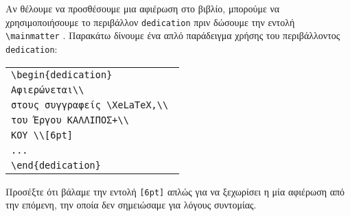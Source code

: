 \begin{refsection}
Αν θέλουμε να προσθέσουμε μια αφιέρωση στο βιβλίο, μπορούμε να χρησιμοποιήσουμε το περιβάλλον \texttt{dedication} πριν δώσουμε την εντολή \verb|\mainmatter| . Παρακάτω δίνουμε ένα απλό παράδειγμα χρήσης του περιβάλλοντος \texttt{dedication}:
\begin{center}
\begin{tabular}{l}
\verb=\begin{dedication}=\\
\verb=Αφιερώνεται\\ =\\
\verb=στους συγγραφείς \XeLaTeX,\\ =\\
\verb=του Έργου ΚΑΛΛΙΠΟΣ+\\ =\\
\verb=ΚΟΥ \\[6pt]=\\
\verb=... =\\
\verb=\end{dedication} =\\
\end{tabular}
\end{center}
Προσέξτε ότι βάλαμε την εντολή \verb|[6pt]| απλώς για να ξεχωρίσει η μία αφιέρωση από την επόμενη, την οποία δεν σημειώσαμε για λόγους συντομίας.


\end{refsection}
